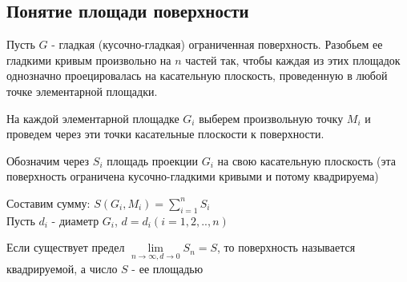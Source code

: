 \subsection{Понятие площади поверхности}

Пусть $G$ - гладкая (кусочно-гладкая) ограниченная поверхность. Разобьем ее гладкими кривым произвольно на $n$ частей так, чтобы каждая из этих площадок однозначно проецировалась на касательную плоскость, проведенную  в любой точке элементарной площадки.

На каждой элементарной площадке $G_i$ выберем произвольную точку $M_i$ и проведем через эти точки касательные плоскости к поверхности. 

Обозначим через $S_i$ площадь проекции $G_i$ на свою касательную плоскость (эта поверхность ограничена кусочно-гладкими кривыми и потому квадрируема)

Составим сумму: $S(G_i,M_i) = \sum\limits_{i=1}^{n}S_i$\\
Пусть $d_i$ - диаметр $G_i$, $d= d_i (i= 1,2,..,n)$

Если существует предел $\lim\limits_{n\to\infty, d\to 0} S_n = S$, то поверхность называется квадрируемой, а число $S$ - ее площадью
